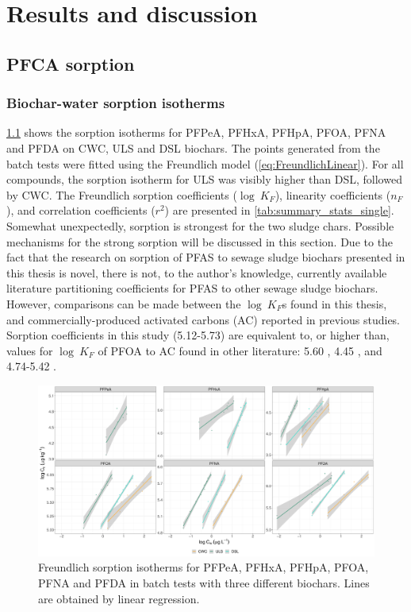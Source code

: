 \chapter{Results and discussion}\label{chap:Results&Disc}
\section{PFCA sorption}
\subsection{Biochar-water sorption isotherms}
\cref{fig:sorption_isotherms} shows the sorption isotherms for PFPeA, PFHxA, PFHpA, PFOA, PFNA and PFDA on CWC, ULS and DSL biochars. The points generated from the batch tests were fitted using the Freundlich model (\cref{eq:FreundlichLinear}). For all compounds, the sorption isotherm for ULS was visibly higher than DSL, followed by CWC. The Freundlich sorption coefficients ($\log~K_F$), linearity coefficients ($n_F$), and correlation coefficients ($r^2$) are presented in \cref{tab:summary_stats_single}. Somewhat unexpectedly, sorption is strongest for the two sludge chars. Possible mechanisms for the strong sorption will be discussed in this section. Due to the fact that the research on sorption of PFAS to sewage sludge biochars presented in this thesis is novel, there is not, to the author's knowledge, currently available literature partitioning coefficients for PFAS to other sewage sludge biochars. However, comparisons can be made between the $\log~K_F$s found in this thesis, and commercially-produced activated carbons (AC) reported in previous studies. Sorption coefficients in this study (5.12-5.73) are equivalent to, or higher than, values for $\log~K_F$ of PFOA to AC found in other literature: 5.60 \citep{kupryianchyk2016biochar}, 4.45 \citep{hansen2010sorption}, and 4.74-5.42 \citep{silvani2019can}. 

\begin{figure}[tb]
    \centering
    \includegraphics[width=\textwidth]{R/figs/Sorption_isotherms_single_BC.pdf}
    \caption{Freundlich sorption isotherms for PFPeA, PFHxA, PFHpA, PFOA, PFNA and PFDA in batch tests with three different biochars. Lines are obtained by linear regression.}
    \label{fig:sorption_isotherms}
\end{figure}

